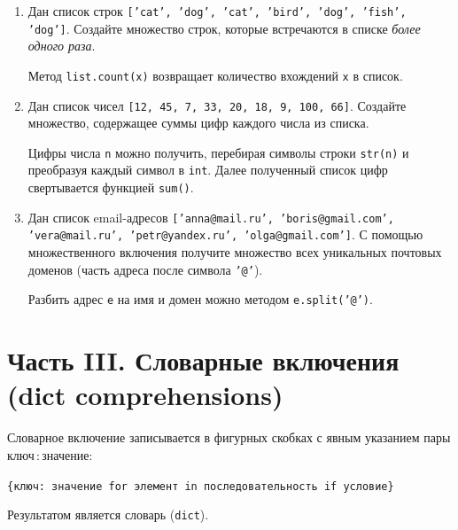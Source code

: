 \documentclass[a4,12pt]{article}
\theoremstyle{remark}
\begin{document}
\begin{enumerate}
    \item Дан список строк \texttt{['cat', 'dog', 'cat', 'bird', 'dog', 'fish', 'dog']}.
    Создайте множество строк, которые встречаются в списке \emph{более одного раза}.

    \begin{exercisehint}
        Метод \texttt{list.count(x)} возвращает количество вхождений \texttt{x}
        в список.
    \end{exercisehint}

    \item Дан список чисел \texttt{[12, 45, 7, 33, 20, 18, 9, 100, 66]}.
    Создайте множество, содержащее суммы цифр каждого числа из списка.

    \begin{exercisehint}
        Цифры числа \texttt{n} можно получить, перебирая символы строки \texttt{str(n)}
        и преобразуя каждый символ в \texttt{int}. Далее полученный список цифр
        свертывается функцией \texttt{sum()}.
    \end{exercisehint}

    \item Дан список email-адресов
    \texttt{['anna@mail.ru', 'boris@gmail.com', 'vera@mail.ru', 'petr@yandex.ru', 'olga@gmail.com']}.
    С помощью множественного включения получите множество всех уникальных
    почтовых доменов (часть адреса после символа \texttt{'@'}).

    \begin{exercisehint}
        Разбить адрес \texttt{e} на имя и домен можно методом \texttt{e.split('@')}.
    \end{exercisehint}

\end{enumerate}


\section*{Часть III. Словарные включения (dict comprehensions)}

\begin{exercisenote}[title=Синтаксис]
Словарное включение записывается в фигурных скобках с явным указанием
пары ключ\,:\,значение:
\begin{center}
    \texttt{\{ключ: значение\ for\ элемент\ in\ последовательность\ if\ условие\}}
\end{center}
Результатом является словарь (\texttt{dict}).
\end{exercisenote}
\end{document}
